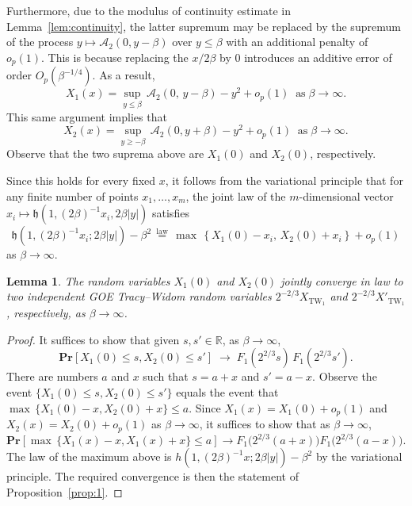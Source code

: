 \documentclass[10pt]{amsart}
\newtheorem{lemm}[theo]{Lemma}\newtheorem{prop}[theo]{Proposition}\newtheorem{coro}[theo]{Corollary}\newtheorem{conj}[theo]{Conjecture}
\theoremstyle{definition}\newtheorem{defi}[theo]{Definition}\newtheorem{rema}[theo]{Remark}\newtheorem{exam}[theo]{Example}\newtheorem{exem}[theo]{Example}\newtheorem{nota}[theo]{Notation}
\DeclareMathOperator{\tw}{TW}
\newcommand{\pr}[1]{\mathbf{Pr}\left[#1\right]}
\newcommand{\R}{\mathbb{R}}
\newcommand{\A}{\mathcal{A}}
\newcommand{\h}{\mathfrak{h}}
\begin{document}
Furthermore, due to the modulus of continuity estimate in Lemma~\ref{lem:continuity}, the latter supremum may be replaced by the supremum of the process $y \mapsto \A_2 (0, y-\beta )$ over $y \leq \beta$ with an additional penalty of $o_p(1)$. This is because replacing the $x/2\beta$ by $0$ introduces an additive error of order $O_p(\beta^{-1/4})$. As a result,
\[
X_1(x) = \sup_{y \leq \beta}\, \A_2(0, \, y-\beta) -y^2 + o_p(1)\;\; \text{as}\; \beta \to \infty.
\]
This same argument implies that
\[
X_2(x) = \sup_{y \geq -\beta}\, \A_2(0,y+\beta) -y^2 + o_p(1)\;\; \text{as}\; \beta \to \infty.
\]
Observe that the two suprema above are $X_1(0)$ and $X_2(0)$, respectively.

Since this holds for every fixed $x$, it follows from the variational principle that for any finite number of points $x_1, \dots, x_m$, the joint law of the $m$-dimensional vector $x_i \mapsto \h(1, (2\beta)^{-1} x_i, 2\beta|y|)$ satisfies
\begin{equation}\label{eqn:thm3c}
\h(1, (2\beta)^{-1} x_i; 2\beta|y|) - \beta^2 \,\overset{\text{law}}{=}\, \max\, \left \{ X_1(0) -x_i,\, X_2(0) +x_i \right \} + o_p(1)
\end{equation}
as $\beta \to \infty$.

\begin{lemm} \label{lem:decorrelation}
The random variables $X_1(0)$ and $X_2(0)$ jointly converge in law to two independent GOE Tracy--Widom random variables $2^{-2/3} X_{\tw_1}$ and $2^{-2/3} X'_{\tw_1}$, respectively, as $\beta \to \infty$.
\end{lemm}

\begin{proof}
It suffices to show that given $s, s' \in \R$, as $\beta \to \infty$,
\[
\pr{X_1(0) \leq s, X_2(0) \leq s'} \; \longrightarrow \;F_1(2^{2/3}s) \, F_1(2^{2/3}s').
\]
There are numbers $a$ and $x$ such that $s = a+x$ and $s' = a-x$. Observe the event $\{X_1(0) \leq s, X_2(0) \leq s'\}$ equals the event that $\max \, \{ X_1(0) - x, X_2(0)+x\} \leq a$. Since $X_1(x) = X_1(0) + o_p(1)$ and $X_2(x) = X_2(0) + o_p(1)$ as $\beta \to \infty$, it suffices to show that as $\beta \to \infty$,
\[
\pr{\max \, \{ X_1(x) - x, X_1(x) +x\} \leq a} \longrightarrow F_1 \big(2^{2/3}(a+x)\big) F_1\big(2^{2/3}(a-x)\big).
\]
The law of the maximum above is $h(1,(2\beta)^{-1}x; 2\beta |y|) - \beta^2$ by the variational principle. The required convergence is then the statement of Proposition~\ref{prop:1}.
\end{proof}
\end{document}
